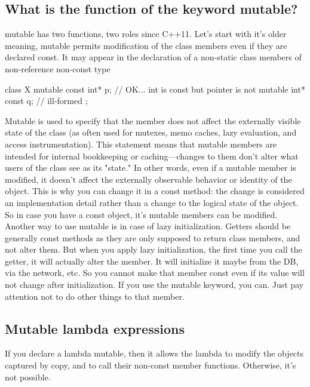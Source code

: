 \documentclass{report}
\begin{document}
\subsection{What is the function of the keyword mutable?}
\bigbreak \noindent 
mutable has two functions, two roles since C++11. Let's start with it's older meaning, mutable permits modification of the class members even if they are declared const.
\bigbreak \noindent 
It may appear in the declaration of a non-static class members of non-reference non-const type
\bigbreak \noindent 
\begin{cppcode}
class X {
    mutable const int* p; // OK... int is const but pointer is not
    mutable int* const q; // ill-formed
};
\end{cppcode}
\bigbreak \noindent 
Mutable is used to specify that the member does not affect the
externally visible state of the class (as often used for mutexes, memo
caches, lazy evaluation, and access instrumentation).
\bigbreak \noindent 
This statement means that mutable members are intended for internal bookkeeping or caching—changes to them don't alter what users of the class see as its "state." In other words, even if a mutable member is modified, it doesn’t affect the externally observable behavior or identity of the object. This is why you can change it in a const method: the change is considered an implementation detail rather than a change to the logical state of the object.
\bigbreak \noindent 
So in case you have a const object, it’s mutable members can be modified.
\bigbreak \noindent 
Another way to use mutable is in case of lazy initialization. Getters
should be generally const methods as they are only supposed to
return class members, and not alter them.
\bigbreak \noindent 
But when you apply lazy initialization, the first time you call the
getter, it will actually alter the member. It will initialize it maybe
from the DB, via the network, etc. So you cannot make that member
const even if its value will not change after initialization.
\bigbreak \noindent 
If you use the mutable keyword, you can. Just pay attention not to
do other things to that member.

\bigbreak \noindent 
\subsection{Mutable lambda expressions}
\bigbreak \noindent 
If you declare a lambda mutable, then it allows the lambda to modify the objects captured by copy, and to call their non-const member functions. Otherwise, it’s not possible.
\end{document}
